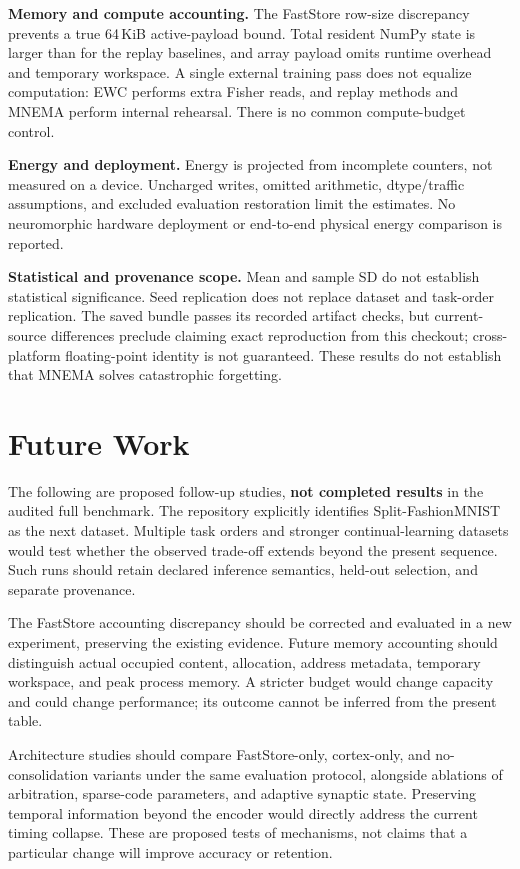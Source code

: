 \documentclass[10pt,a4paper]{article}
\begin{document}
\textbf{Memory and compute accounting.} The FastStore row-size discrepancy
prevents a true 64\,KiB active-payload bound. Total resident NumPy state is
larger than for the replay baselines, and array payload omits runtime overhead
and temporary workspace. A single external training pass does not equalize
computation: EWC performs extra Fisher reads, and replay methods and MNEMA
perform internal rehearsal. There is no common compute-budget control.

\textbf{Energy and deployment.} Energy is projected from incomplete counters,
not measured on a device. Uncharged writes, omitted arithmetic, dtype/traffic
assumptions, and excluded evaluation restoration limit the estimates. No
neuromorphic hardware deployment or end-to-end physical energy comparison is
reported.

\textbf{Statistical and provenance scope.} Mean and sample SD do not establish
statistical significance. Seed replication does not replace dataset and
task-order replication. The saved bundle passes its recorded artifact checks,
but current-source differences preclude claiming exact reproduction from this
checkout; cross-platform floating-point identity is not guaranteed. These
results do not establish that MNEMA solves catastrophic forgetting.

\section{Future Work}
The following are proposed follow-up studies, \textbf{not completed results}
in the audited full benchmark. The repository explicitly identifies
Split-FashionMNIST as the next dataset. Multiple task orders and stronger
continual-learning datasets would test whether the observed trade-off extends
beyond the present sequence. Such runs should retain declared inference
semantics, held-out selection, and separate provenance.

The FastStore accounting discrepancy should be corrected and evaluated in a
new experiment, preserving the existing evidence. Future memory accounting
should distinguish actual occupied content, allocation, address metadata,
temporary workspace, and peak process memory. A stricter budget would change
capacity and could change performance; its outcome cannot be inferred from
the present table.

Architecture studies should compare FastStore-only, cortex-only, and
no-consolidation variants under the same evaluation protocol, alongside
ablations of arbitration, sparse-code parameters, and adaptive synaptic state.
Preserving temporal information beyond the encoder would directly address the
current timing collapse. These are proposed tests of mechanisms, not claims
that a particular change will improve accuracy or retention.
\end{document}
